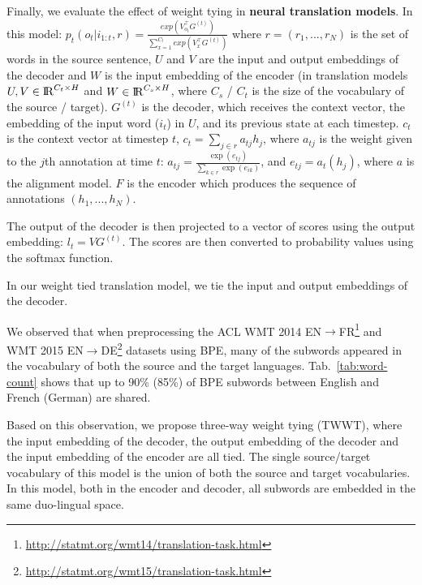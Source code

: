 \documentclass[11pt]{article}
\begin{document}
%
Finally, we evaluate the effect of weight tying in \textbf{neural translation models}. 
In this model:
$p_t(o_t|i_{1:t},r) = \frac {exp(V_{o_t}^\top G^{(t)})}{\sum_{x=1}^{C_t} exp(V^\top_x G^{(t)})}   $ where $r = (r_1, ..., r_N)$ is the set of words in the source sentence,  $U$ and $V$ are the input and output embeddings of the decoder and $W$ is the input embedding of the encoder (in translation models $U,V \in {\rm I\!R}^{C_t \times H}$ and $W \in {\rm I\!R}^{C_s \times H}$, where $C_s$ / $C_t$ is the size of the vocabulary of the source / target).
$G^{(t)}$ is the decoder, which receives the context vector, the embedding of the input word ($i_t$) in $U$, and its previous state at each timestep. $c_t$ is the context vector at timestep $t$,  $ c_t =\sum _{j \in r} a_{tj} h_j$, where $a_{tj}$ is the weight given to the $j$th annotation at time $t$: $a_{tj} = \frac {\exp(e_{tj})} { \sum_{k \in r} \exp(e_{ik} )     }$, and $e_{tj} = a_t(h_j)$, where $a$ is the alignment model.  
$F$ is the encoder which produces the sequence of annotations $(h_1, ..., h_N)$.

The output of the decoder is then projected to a vector  of scores using the output embedding: $l_t = V G^{(t)}$. The scores are then converted to  probability values using the softmax function.



In our weight tied translation model, we tie the input and output embeddings of the decoder.%

%

%
We observed that when preprocessing the ACL WMT 2014 EN$\rightarrow$FR\footnote{\tiny \url{http://statmt.org/wmt14/translation-task.html}} and WMT 2015 EN$\rightarrow$DE\footnote{\tiny \url{http://statmt.org/wmt15/translation-task.html}} datasets using  BPE, many of the subwords appeared in the vocabulary of both the source and the target languages. Tab.~\ref{tab:word-count} shows that up to 90\% (85\%) of BPE subwords between English and French (German) are shared. 


Based on this observation, we propose three-way weight tying (TWWT), where the input embedding of the decoder, the output embedding of the decoder and the input embedding of the encoder are all tied. The single source/target vocabulary of this model is the union of both the source and target vocabularies. In this model, both in the encoder and decoder, all subwords are embedded in the same duo-lingual space. 
\end{document}
